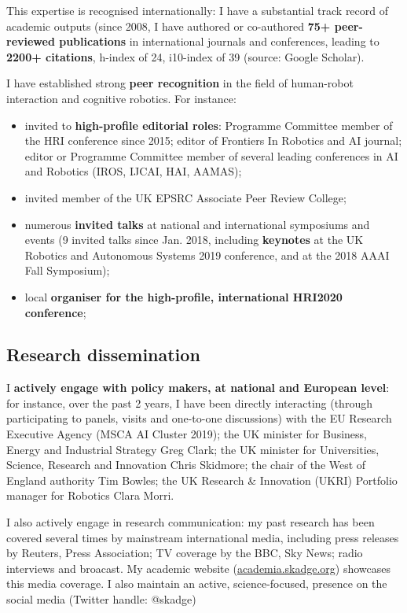 \documentclass[11pt,a4paper]{report}
\begin{document}
This expertise is recognised internationally: I have a substantial track record
of academic outputs (since 2008, I have authored or co-authored \textbf{75+ peer-reviewed
publications} in international journals and conferences, leading to \textbf{2200+
citations}, h-index of 24, i10-index of 39 (source: Google Scholar).

I have established strong \textbf{peer recognition} in the field of human-robot interaction
and cognitive robotics. For instance:

\begin{itemize}[noitemsep,topsep=0pt,parsep=0pt,partopsep=0pt]
    \item invited to \textbf{high-profile editorial roles}: Programme Committee member of the HRI
conference since 2015; editor of Frontiers In Robotics and AI journal; editor or
Programme Committee member of several leading conferences in AI and Robotics (IROS, IJCAI, HAI, AAMAS);
    \item invited member of the UK EPSRC Associate Peer Review College;
    \item numerous \textbf{invited talks} at national and international symposiums and
        events (9 invited talks since Jan. 2018, including \textbf{keynotes} at the UK Robotics
and Autonomous Systems 2019 conference, and at the 2018 AAAI Fall Symposium);
    \item local \textbf{organiser for the high-profile, international HRI2020
        conference};
\end{itemize}


\subsection{Research dissemination}

I \textbf{actively engage with policy makers, at national and European
level}: for instance, over the past 2 years, I have been directly interacting
(through participating to panels, visits and one-to-one discussions) with the EU
Research Executive Agency (MSCA AI Cluster 2019); the UK minister for Business,
Energy and Industrial Strategy Greg Clark; the UK minister for Universities,
Science, Research and Innovation Chris Skidmore; the chair of the West of
England authority Tim Bowles; the UK Research \& Innovation (UKRI) Portfolio
manager for Robotics Clara Morri.


I also actively engage in research communication: my past research has been
covered several times by mainstream international media, including press
releases by Reuters, Press Association; TV coverage by the BBC, Sky News; radio
interviews and broacast. My academic website (\url{academia.skadge.org})
showcases this media coverage. I also maintain an active, science-focused, presence on the social
media (Twitter handle: @skadge)
\end{document}
